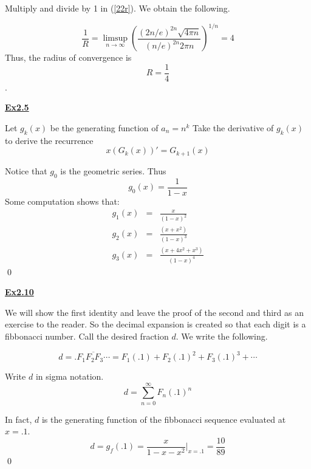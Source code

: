 \documentclass{article}
\newcommand{\new}[1]{
    \vspace{2mm}
    \noindent
    \textbf{
    \underline{#1}}
}
\begin{document}
Multiply and divide by 1 in (\ref{22r}). We obtain the following. 

\[
    \frac 1 R 
    = 
    \limsup_{n \rightarrow \infty} 
    \left(
    \frac{
        (2n/e)^{2n} \sqrt{4\pi n}
    }{
        (n/e)^{2n} 2\pi n
    }
    \right)^{1/n}
    = 4
\]
Thus, the radius of convergence is 
\[
\boxed{
    R = \frac 1 4
}
\]. 

\new{Ex2.5}

Let $g_k(x)$ be the generating function of $a_n = n^k$
Take the derivative of $g_k(x)$ to derive the recurrence
\[
x(G_k(x))' = G_{k+1}(x)
\]

Notice that $g_0$ is the geometric series. Thus 
\[
    g_0(x) = \frac 1 {1 - x}
\]
Some computation shows that:
\begin{eqnarray*}
g_1(x) & = & \frac x {(1-x)^2}
\\
g_2(x) & = & \frac {(x +x^2)}{(1-x)^3}
\\
g_3(x) & = & \frac{(x + 4x^2 + x^3)}{(1-x)^4}
\end{eqnarray*}
\hfill \qed

\new{Ex2.10}

We will show the first identity and leave the proof 
of the second and third as an exercise to the reader. 
So the decimal expansion is created so that each digit 
is a fibbonacci number. Call the desired fraction $d$. 
We write the following. 

\[
    d = .\overline{F_1F_2F_3\cdots} = F_1 (.1) + F_2 (.1)^2 + F_3 (.1)^3 + \cdots 
\]

Write $d$ in sigma notation. 
\[
    d = \sum_{n = 0}^\infty F_n (.1)^n
\]

In fact, $d$ is the generating function of the fibbonacci sequence evaluated 
\linebreak at $x = .1$. 
\[
    d = g_f(.1) = \frac x {1 - x - x^2} \bigg|_{x = .1}
    = \frac {10} {89}
\]
\hfill \qed
\end{document}
